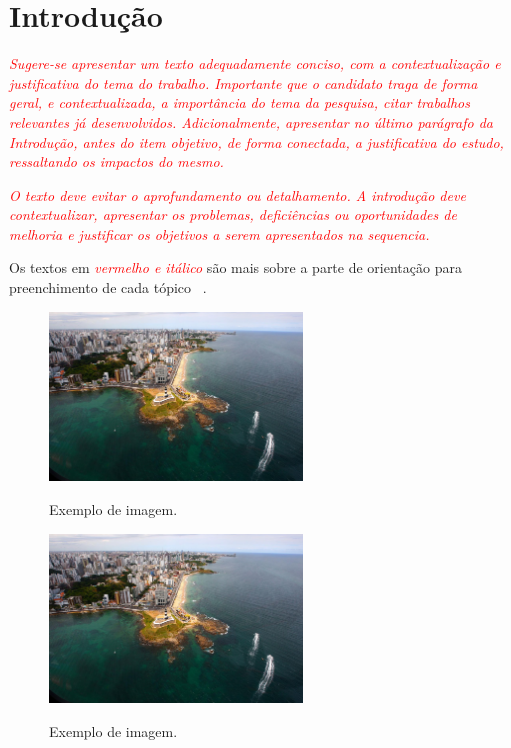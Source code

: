 \chapter{Introdução}
\label{ch:introducao}

\textit{\textcolor{red}{Sugere-se apresentar um texto adequadamente conciso, com a contextualização e justificativa do tema do trabalho. Importante que o candidato traga de forma geral, e contextualizada, a importância do tema da pesquisa, citar trabalhos relevantes já desenvolvidos. Adicionalmente, apresentar no último parágrafo da Introdução, antes do item objetivo, de forma conectada, a justificativa do estudo, ressaltando os impactos do mesmo.}}

\textit{\textcolor{red}{O texto deve evitar o aprofundamento ou detalhamento. A introdução deve contextualizar, apresentar os problemas, deficiências ou oportunidades de melhoria e justificar os objetivos a serem apresentados na sequencia.}}

Os textos em \textit{\textcolor{red}{vermelho e itálico}} são mais sobre a parte de orientação para preenchimento de cada tópico ~\cite{abadi2016tensorflow}.

\begin{figure}
    \caption{Exemplo de imagem.}
    \centering
    \includegraphics[width=0.6\textwidth]{images/farol_da_barra.jpg}
    \label{fig:seismic_acq}
\end{figure}

\lipsum[1-1]

\begin{figure}
    \caption{Exemplo de imagem.}
    \centering
    \includegraphics[width=0.6\textwidth]{images/farol_da_barra.jpg}
    \fea
    \label{fig:fig_exemplo_2}
\end{figure}

